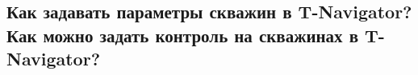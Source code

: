 

\subsection{Как задавать параметры скважин в T-Navigator? Как можно задать контроль на скважинах в T-Navigator?}

